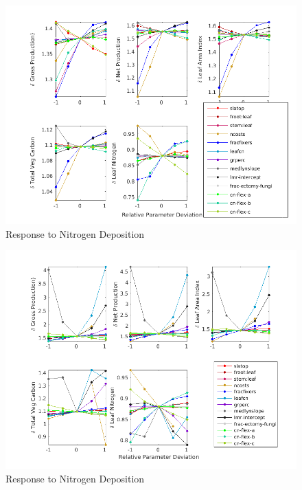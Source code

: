 \documentclass[draft,linenumbers]{agujournal}
\begin{document}
 \begin{figure}[h]
     \centering
     \includegraphics[width=35pc]{matlab/figures/frac_deviation_CO2_response_1CLM5_1x1pt_Br-cax_ens_transient_ELEV_PI_y1.png}
     \caption{Response to Nitrogen Deposition}
     \label{Cax CO2 response}
  \end{figure}
  
  
  
 \begin{figure}[h]
     \centering
     \includegraphics[width=35pc]{matlab/figures/frac_deviation_CO2_response_1CLM5_1x1pt_US-ORN_ens_transient_ELEV_PI_y1.png}
     \caption{Response to Nitrogen Deposition}
     \label{ORNL CO2 response}
  \end{figure}
  
\end{document}
